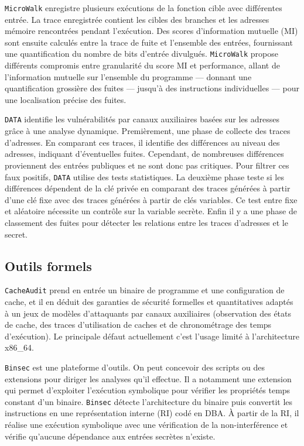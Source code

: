 \texttt{MicroWalk} enregistre plusieurs exécutions de la fonction cible avec différentes entrée. La trace enregistrée contient les cibles des branches et les adresses mémoire rencontrées pendant l’exécution. Des scores d’information mutuelle (MI) sont ensuite calculés entre la trace de fuite et l’ensemble des entrées, fournissant une quantification du nombre de bits d’entrée divulgués. \texttt{MicroWalk} propose différents compromis entre granularité du score MI et performance, allant de l’information mutuelle sur l’ensemble du programme — donnant une quantification grossière des fuites — jusqu’à des instructions individuelles — pour une localisation précise des fuites.\medbreak

\texttt{DATA} identifie les vulnérabilités par canaux auxiliaires basées sur les adresses grâce à une analyse dynamique. Premièrement, une phase de collecte des traces d’adresses. En comparant ces traces, il identifie des différences au niveau des adresses, indiquant d’éventuelles fuites. Cependant, de nombreuses différences proviennent des entrées publiques et ne sont donc pas critiques. Pour filtrer ces faux positifs, \texttt{DATA} utilise des tests statistiques. La deuxième phase teste si les différences dépendent de la clé privée en comparant des traces générées à partir d’une clé fixe avec des traces générées à partir de clés variables. Ce test entre fixe et aléatoire nécessite un contrôle sur la variable secrète. Enfin il y a une phase de classement des fuites pour détecter les relations entre les traces d’adresses et le secret.\medbreak


\subsection*{Outils formels}


\texttt{CacheAudit} prend en entrée un binaire de programme et une configuration de cache, et il en déduit des garanties de sécurité formelles et quantitatives adaptés à un jeux de modèles d'attaquants par canaux auxiliaires (observation des états de cache, des traces d'utilisation de caches et de chronométrage des temps d’exécution). Le principale défaut actuellement c'est l'usage limité à l'architecture x86\_64.\medbreak


\texttt{Binsec} est une plateforme d'outils. On peut concevoir des scripts ou des extensions pour diriger les analyses qu'il effectue. Il a notamment une extension qui permet d'exploiter l'exécution symbolique pour vérifier les propriétés temps constant d'un binaire. \texttt{Binsec} détecte l'architecture du binaire puis convertit les instructions en une représentation interne (RI) codé en DBA. À partir de la RI, il réalise une exécution symbolique avec une vérification de la non-interférence et vérifie qu'aucune dépendance aux entrées secrètes n'existe.\medbreak

